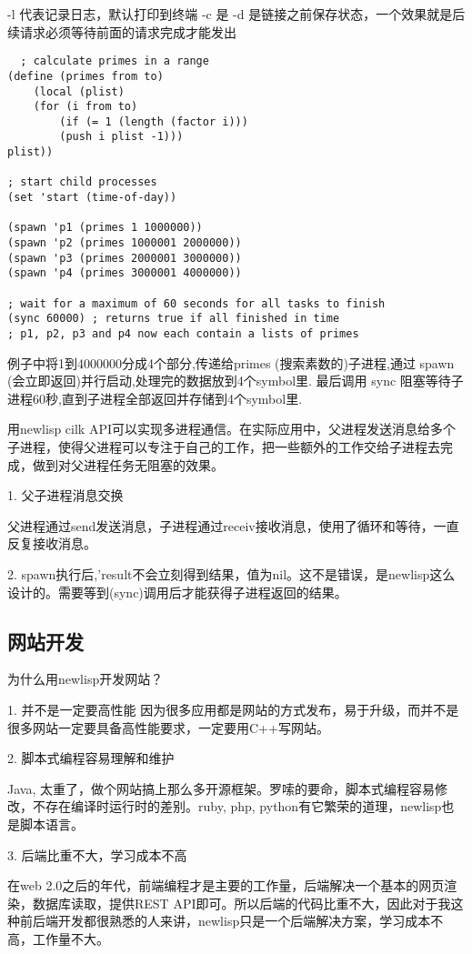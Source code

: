 \documentclass[cn,11pt]{elegantbook}
\begin{document}
-l 代表记录日志，默认打印到终端
-c 是
-d 是链接之前保存状态，一个效果就是后续请求必须等待前面的请求完成才能发出

\begin{lstlisting}
  ; calculate primes in a range
(define (primes from to)
    (local (plist)
    (for (i from to)
        (if (= 1 (length (factor i)))
        (push i plist -1)))
plist))
 
; start child processes
(set 'start (time-of-day))
 
(spawn 'p1 (primes 1 1000000))
(spawn 'p2 (primes 1000001 2000000))
(spawn 'p3 (primes 2000001 3000000))
(spawn 'p4 (primes 3000001 4000000))
 
; wait for a maximum of 60 seconds for all tasks to finish
(sync 60000) ; returns true if all finished in time
; p1, p2, p3 and p4 now each contain a lists of primes
\end{lstlisting}
例子中将1到4000000分成4个部分,传递给primes (搜索素数的)子进程,通过 spawn (会立即返回)并行启动,处理完的数据放到4个symbol里. 最后调用 sync 阻塞等待子进程60秒,直到子进程全部返回并存储到4个symbol里.

用newlisp cilk API可以实现多进程通信。在实际应用中，父进程发送消息给多个子进程，使得父进程可以专注于自己的工作，把一些额外的工作交给子进程去完成，做到对父进程任务无阻塞的效果。

1. 父子进程消息交换

父进程通过send发送消息，子进程通过receiv接收消息，使用了循环和等待，一直反复接收消息。

2. spawn执行后,'result不会立刻得到结果，值为nil。这不是错误，是newlisp这么设计的。需要等到(sync)调用后才能获得子进程返回的结果。

\subsection{网站开发}

为什么用newlisp开发网站？

1. 并不是一定要高性能
因为很多应用都是网站的方式发布，易于升级，而并不是很多网站一定要具备高性能要求，一定要用C++写网站。

2. 脚本式编程容易理解和维护

Java, 太重了，做个网站搞上那么多开源框架。罗嗦的要命，脚本式编程容易修改，不存在编译时运行时的差别。ruby, php, python有它繁荣的道理，newlisp也是脚本语言。

3. 后端比重不大，学习成本不高

在web 2.0之后的年代，前端编程才是主要的工作量，后端解决一个基本的网页渲染，数据库读取，提供REST API即可。所以后端的代码比重不大，因此对于我这种前后端开发都很熟悉的人来讲，newlisp只是一个后端解决方案，学习成本不高，工作量不大。
\end{document}
